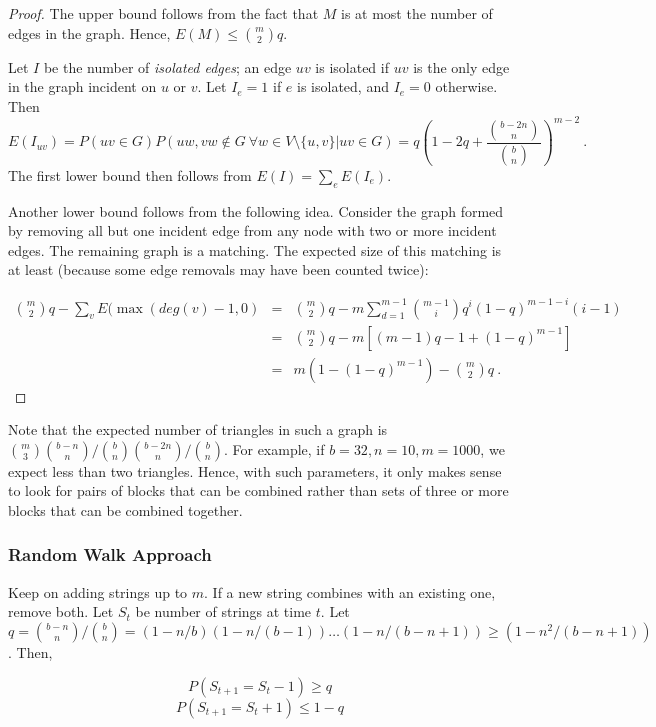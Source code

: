 \begin{proof}
The upper bound follows from the fact that $M$ is at most the number
of edges in the graph. Hence, $E(M)\leq {m \choose 2} q$.

Let $I$ be the number of \emph{isolated edges}; an edge $uv$ is
isolated if $uv$ is the only edge in the graph incident on $u$ or
$v$. Let $I_e=1$ if $e$ is isolated, and $I_e=0$ otherwise. Then
\[
E(I_{uv})=P(uv\in G)P(uw, vw \not \in G ~ \forall w\in V\setminus \{u,v\}| uv\in G)
=q\left (1-2q+\frac{{b-2n \choose n}}{{b \choose n}}\right )^{m-2} \ .
\]
The first lower bound then follows from $E(I)=\sum_e E(I_e)$.

Another lower bound follows from the following idea. Consider the
graph formed by removing all but one incident edge from any node with
two or more incident edges. The remaining graph is a matching. The
expected size of this matching is at least (because some edge removals
may have been counted twice):

\begin{eqnarray*}
{m \choose 2} q-\sum_v E(\max(deg(v)-1,0)
&=&
{m \choose 2} q
-m\sum_{d=1}^{m-1} {m-1\choose i} q^i (1-q)^{m-1-i}(i-1)\\
&=& {m \choose 2} q-m[(m-1)q-1+(1-q)^{m-1}]\\
&=& m(1-(1-q)^{m-1})-{m \choose 2} q \ .
\end{eqnarray*}
\end{proof}

Note that the expected number of triangles in such a graph is ${m
  \choose 3} {b-n \choose n}/{b\choose n} {b-2n \choose n}/{b\choose
  n}$. For example, if $b=32, n=10, m=1000$, we expect less than two
triangles. Hence, with such parameters, it only makes sense to look for
pairs of blocks that can be combined rather than sets of three or more
blocks that can be combined together.

\subsubsection{Random Walk Approach}

Keep on adding strings up to $m$. If a new string combines with an
existing one, remove both. Let $S_t$ be number of strings at time
$t$. Let $q={b-n \choose n}/{b\choose n}=(1-n/b)(1-n/(b-1))\ldots
(1-n/(b-n+1))\geq (1-n^2/(b-n+1))$. Then,

\[P(S_{t+1}=S_t-1)\geq q\]
\[P(S_{t+1}=S_t+1)\leq 1-q\]

